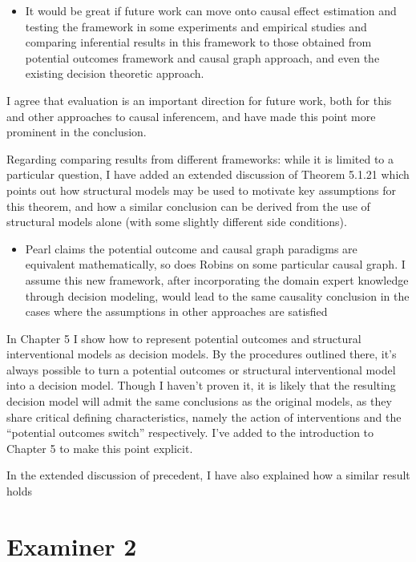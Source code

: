 \documentclass[12pt, a4paper]{article}
\begin{document}
\begin{itemize}
    \item It would be great if future work can move onto causal effect estimation and testing the framework in some experiments and empirical studies and comparing inferential results in this framework to those obtained from potential outcomes framework and causal graph approach, and even the existing decision theoretic approach.
\end{itemize}

I agree that evaluation is an important direction for future work, both for this and other approaches to causal inferencem, and have made this point more prominent in the conclusion.

Regarding comparing results from different frameworks: while it is limited to a particular question, I have added an extended discussion of Theorem 5.1.21 which points out how structural models may be used to motivate key assumptions for this theorem, and how a similar conclusion can be derived from the use of structural models alone (with some slightly different side conditions).

\begin{itemize}
    \item Pearl claims the potential outcome and causal graph paradigms are equivalent mathematically, so does Robins on some particular causal graph. I assume this new framework, after incorporating the domain expert knowledge through decision modeling, would lead to the same causality conclusion in the cases where the assumptions in other approaches are satisfied
\end{itemize}

In Chapter 5 I show how to represent potential outcomes and structural interventional models as decision models. By the procedures outlined there, it's always possible to turn a potential outcomes or structural interventional model into a decision model. Though I haven't proven it, it is likely that the resulting decision model will admit the same conclusions as the original models, as they share critical defining characteristics, namely the action of interventions and the ``potential outcomes switch'' respectively. I've added to the introduction to Chapter 5 to make this point explicit.

In the extended discussion of precedent, I have also explained how a similar result holds 

\section{Examiner 2}
\end{document}
